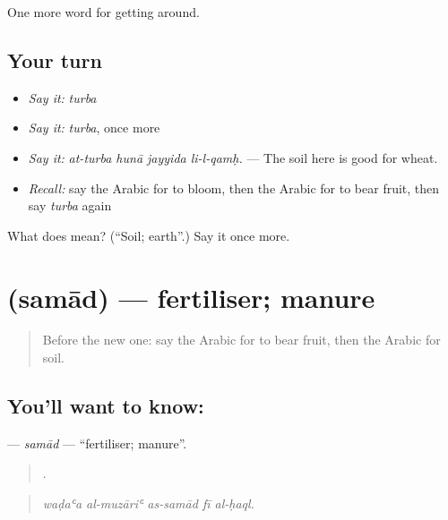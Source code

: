 \begin{grammarlens}[title={What you've built}]
One more word for getting around.
\end{grammarlens}

\subsection*{Your turn}
\begin{itemize}
\raggedright
  \item \emph{Say it:} \emph{turba}
  \item \emph{Say it:} \emph{turba}, once more
  \item \emph{Say it:} \emph{at-turba hunā jayyida li-l-qamḥ.} — The soil here is good for wheat.
  \item \emph{Recall:} say the Arabic for to bloom, then the Arabic for to bear fruit, then say \emph{turba} again
\end{itemize}

\begin{tcolorbox}[breakable,colback=teal!4,colframe=teal!35!black,title={Before you move on}]
What does  mean? (\textquotedblleft{}Soil; earth\textquotedblright{}.) Say it once more.
\end{tcolorbox}
\section[\texorpdfstring{\ar{سماد} (samād)}{سماد (samād)}]{ (samād) — fertiliser; manure}

\label{lesson:AR-C469-samad}



\begin{quote}
Before the new one: say the Arabic for to bear fruit, then the Arabic for soil.
\end{quote}

\subsection*{You'll want to know: }
\textbf{} — \emph{samād} — \textquotedblleft{}fertiliser; manure\textquotedblright{}.

\begin{quote}
    .
\end{quote}

\begin{quote}
\emph{waḍaʿa al-muzāriʿ as-samād fī al-ḥaql.}
\end{quote}

